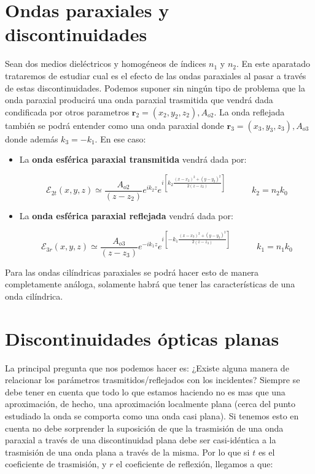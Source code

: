 \documentclass[12pt,a4paper]{book}
\numberwithin{equation}{section}
\numberwithin{figure}{section}
\newcommand{\tquad}{\quad \quad \quad}
\newcommand{\ccorchetes}[1]{\left[ #1  \right]}
\newcommand{\1}{_{(1)}}
\newcommand{\2}{_{(2)}}
\newcommand{\rn}{\mathbf{r}}
\theoremstyle{definition}
\begin{document}
\section{Ondas paraxiales y discontinuidades}

Sean dos medios dieléctricos y homogéneos de índices $n_1$ y $n_2$. En este aparatado trataremos de estudiar cual es el efecto de las ondas paraxiales al pasar a través de estas discontinuidades. Podemos suponer sin ningún tipo de problema que la onda paraxial producirá una onda paraxial trasmitida que vendrá dada condificada por otros parametros $\rn_2 = (x_2,y_2,z_2),A_{o2}$. La onda reflejada también se podrá entender como una onda paraxial donde $\rn_3 = (x_3,y_3,z_3),A_{o3}$ donde además $k_3 = - k_1$. En ese caso:

\begin{itemize}
\item La \textbf{onda esférica paraxial transmitida} vendrá dada por:

\begin{equation}
\mathcal{E}_{2t} (x,y,z) \simeq  \dfrac{A_{o2}}{(z-z_2)} e^{i k_2 z}  e^{i \ccorchetes{k_2 \frac{(x-x_2)^2+(y-y_2)^2}{2 (z-z_2)}}}  \tquad k_2 = n_2 k_0
\end{equation}

\item La \textbf{onda esférica paraxial reflejada} vendrá dada por:

\begin{equation}
\mathcal{E}_{3r} (x,y,z) \simeq  \dfrac{A_{o3}}{(z-z_3)} e^{-i k_1 z}  e^{i \ccorchetes{-k_1 \frac{(x-x_3)^2+(y-y_3)^2}{2 (z-z_3)}}}  \tquad k_1 = n_1 k_0
\end{equation}
\end{itemize}

Para las ondas cilíndricas paraxiales se podrá hacer esto de manera completamente análoga, solamente habrá que tener las características de una onda cilíndrica.

\section{Discontinuidades ópticas planas}

La principal pregunta que nos podemos hacer es: ¿Existe alguna manera de relacionar los parámetros trasmitidos/reflejados con los incidentes? Siempre se debe tener en cuenta que todo lo que estamos haciendo no es mas que una aproximación, de hecho, una aproximación localmente plana (cerca del punto estudiado la onda se comporta como una onda casi plana). Si tenemos esto en cuenta no debe sorprender  la suposición de que la trasmisión de una onda paraxial a través de una discontinuidad plana debe ser casi-idéntica a la trasmisión de una onda plana a través de la misma. Por lo que si $t$ es el coeficiente de trasmisión, y $r$ el coeficiente de reflexión, llegamos a que: 
\end{document}
